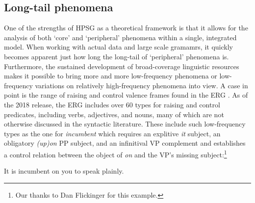 \documentclass[output=paper,nonflat]{langsci/langscibook}
\begin{document}
\subsection{Long-tail phenomena} %
One of the strengths of HPSG as a theoretical framework is that it allows for the analysis of both `core' and `peripheral' phenomena within a single, integrated model. When working with actual data and large scale gramamrs, it quickly becomes apparent just how long the long-tail of `peripheral' phenomena is. Furthermore, the sustained development of broad-coverage linguistic resources makes it possible to bring more and more low-frequency phenomena or low-frequency variations on relatively high-frequency phenomena into view. A case in point is the range of raising and control valence frames found in the ERG \cite{Flickinger2000a,Flickinger2011a-u}. As of the 2018 release, the ERG includes over 60 types for raising and control predicates, including verbs, adjectives, and nouns, many of which are not otherwise discussed in the syntactic literature. These include such low-frequency types as the one for \textit{incumbent} which requires an explitive \textit{it} subject, an obligatory \textit{(up)on} PP subject, and an infinitival VP complement and establishes a control relation between the object of \textit{on} and the VP's missing subject:\footnote{Our thanks to Dan Flickinger for this example.}

\begin{exe}
\ex\label{cl:incumbent} 
It is incumbent on you to speak plainly.
\end{exe}





\end{document}
